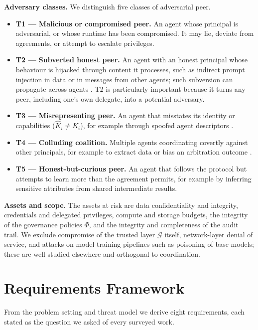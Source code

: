 \documentclass[conference]{IEEEtran}
\providecommand{\tightlist}{\setlength{\itemsep}{0pt}\setlength{\parskip}{0pt}}
\begin{document}
\textbf{Adversary classes.} We distinguish five classes of adversarial peer.

\begin{itemize}
\tightlist
\item
  \textbf{T1 --- Malicious or compromised peer.} An agent whose principal is adversarial, or whose runtime has been compromised. It may lie, deviate from agreements, or attempt to escalate privileges.
\item
  \textbf{T2 --- Subverted honest peer.} An agent with an honest principal whose behaviour is hijacked through content it processes, such as indirect prompt injection in data or in messages from other agents; such subversion can propagate across agents \cite{lee2024prompt, an2026aciarena}. T2 is particularly important because it turns any peer, including one's own delegate, into a potential adversary.
\item
  \textbf{T3 --- Misrepresenting peer.} An agent that misstates its identity or capabilities (\(\hat{K}_i \neq K_i\)), for example through spoofed agent descriptors \cite{habler2025securea2a, lotfi2026a2abreak}.
\item
  \textbf{T4 --- Colluding coalition.} Multiple agents coordinating covertly against other principals, for example to extract data or bias an arbitration outcome \cite{hammond2025multiagent, motwani2024collusion}.
\item
  \textbf{T5 --- Honest-but-curious peer.} An agent that follows the protocol but attempts to learn more than the agreement permits, for example by inferring sensitive attributes from shared intermediate results.
\end{itemize}

\textbf{Assets and scope.} The assets at risk are data confidentiality and integrity, credentials and delegated privileges, compute and storage budgets, the integrity of the governance policies \(\Phi\), and the integrity and completeness of the audit trail. We exclude compromise of the trusted layer \(\mathcal{G}\) itself, network-layer denial of service, and attacks on model training pipelines such as poisoning of base models; these are well studied elsewhere and orthogonal to coordination.

\section{Requirements Framework}\label{sec-4}

From the problem setting and threat model we derive eight requirements, each stated as the question we asked of every surveyed work.
\end{document}
